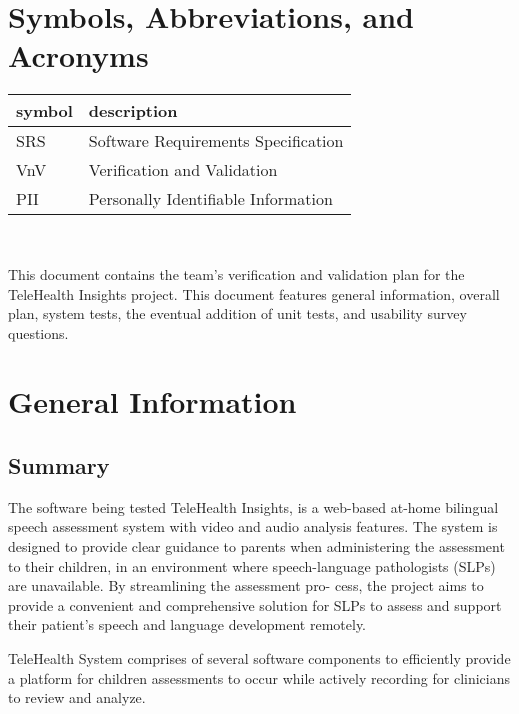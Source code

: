 \documentclass[12pt, titlepage]{article}
\begin{document}
\newpage

\tableofcontents

\listoftables

\newpage

\section{Symbols, Abbreviations, and Acronyms}

\renewcommand{\arraystretch}{1.2}
\begin{tabular}{l l} 
  \toprule		
  \textbf{symbol} & \textbf{description}\\
  \midrule 
  SRS & Software Requirements Specification\\
  VnV & Verification and Validation\\
  PII & Personally Identifiable Information\\
  \bottomrule
\end{tabular}\\

\newpage


\hspace{2 em} This document contains the team's verification and validation plan for the TeleHealth
Insights project. This document features general information, overall plan, system tests,
the eventual addition of unit tests, and usability survey questions.

\section{General Information}

\subsection{Summary}

  The software being tested TeleHealth Insights, is a web-based at-home bilingual
  speech assessment system with video and audio analysis features. The system is designed to provide clear 
  guidance to parents when administering the assessment to their children, in an environment where speech-language
  pathologists (SLPs) are unavailable. By streamlining the assessment pro-
  cess, the project aims to provide a convenient and comprehensive solution
  for SLPs to assess and support their patient's speech and language development remotely.

  TeleHealth System comprises of several software components to efficiently provide 
  a platform for children assessments to occur while actively recording for clinicians to review and analyze. 
\end{document}
